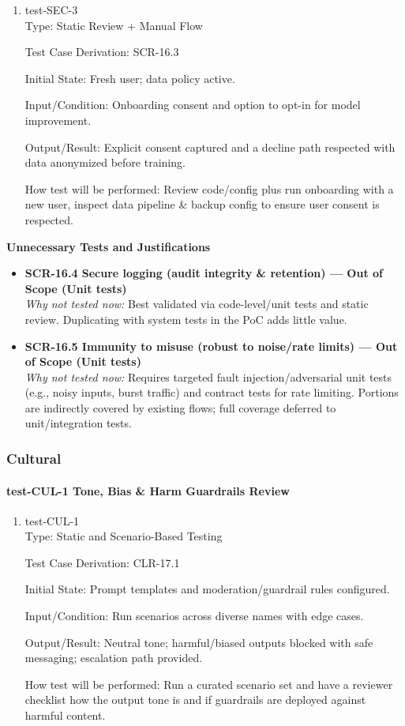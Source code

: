 \documentclass[12pt, titlepage]{article}
\begin{document}
\begin{enumerate}
\item{test-SEC-3\\}
Type: Static Review + Manual Flow

Test Case Derivation: SCR-16.3

Initial State: Fresh user; data policy active.

Input/Condition: Onboarding consent and option to opt-in for model improvement.

Output/Result: Explicit consent captured and a decline path respected with data anonymized before training.

How test will be performed: Review code/config plus run onboarding with a new user, inspect data pipeline \& backup config to ensure user consent is respected.
\end{enumerate}

\noindent\textbf{Unnecessary Tests and Justifications}
\begin{itemize}
\item \textbf{SCR-16.4 Secure logging (audit integrity \& retention) — Out of Scope (Unit tests)}\\
\emph{Why not tested now:} Best validated via code-level/unit tests and static review. Duplicating with system tests in the PoC adds little value.
\item \textbf{SCR-16.5 Immunity to misuse (robust to noise/rate limits) — Out of Scope (Unit tests)}\\
\emph{Why not tested now:} Requires targeted fault injection/adversarial unit tests (e.g., noisy inputs, burst traffic) and contract tests for rate limiting. Portions are indirectly covered by existing flows; full coverage deferred to unit/integration tests.
\end{itemize}

\subsubsection{Cultural}

\paragraph{test-CUL-1 Tone, Bias \& Harm Guardrails Review}

\begin{enumerate}
\item{test-CUL-1\\}
Type: Static and Scenario-Based Testing

Test Case Derivation: CLR-17.1

Initial State: Prompt templates and moderation/guardrail rules configured.

Input/Condition: Run scenarios across diverse names with edge cases.

Output/Result: Neutral tone; harmful/biased outputs blocked with safe messaging; escalation path provided.

How test will be performed: Run a curated scenario set and have a reviewer checklist how the output tone is and if guardrails are deployed against harmful content.
\end{enumerate}
\end{document}
